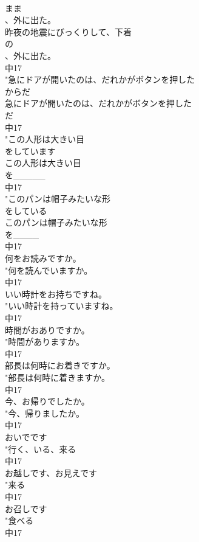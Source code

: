 \documentclass[8pt]{extreport}
\begin{document}
\begin{CJK}{UTF8}{min}
\\	まま
\\	、外に出た。
\\	昨夜の地震にびっくりして、下着
\\	の
\\	、外に出た。
\\	中17
\\	"急にドアが開いたのは、だれかがボタンを押した
\\	からだ
\\	急にドアが開いたのは、だれかがボタンを押した
\\	だ
\\	中17
\\	"この人形は大きい目
\\	をしています
\\	この人形は大きい目
\\	を_____
\\	中17
\\	"このパンは帽子みたいな形
\\	をしている
\\	このパンは帽子みたいな形
\\	を____
\\	中17
\\	何をお読みですか。	
\\	"何を読んでいますか。
\\	中17
\\	いい時計をお持ちですね。	
\\	"いい時計を持っていますね。
\\	中17
\\	時間がおありですか。	
\\	"時間がありますか。
\\	中17
\\	部長は何時にお着きですか。	
\\	"部長は何時に着きますか。
\\	中17
\\	今、お帰りでしたか。	
\\	"今、帰りましたか。
\\	中17
\\	おいでです	
\\	"行く、いる、来る　
\\	中17
\\	お越しです、お見えです	
\\	"来る　
\\	中17
\\	お召しです	
\\	"食べる　
\\	中17

\end{CJK}
\end{document}
